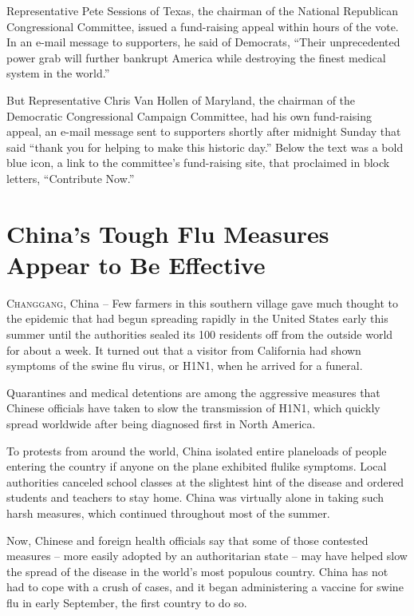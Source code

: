 ﻿\documentclass[12pt]{article}
\begin{document}
Representative Pete Sessions of Texas, the chairman of the National Republican Congressional
Committee, issued a fund-raising appeal within hours of the vote. In an e-mail message to
supporters, he said of Democrats, ``Their unprecedented power grab will further bankrupt America
while destroying the finest medical system in the world.''

But Representative Chris Van Hollen of Maryland, the chairman of the Democratic Congressional
Campaign Committee, had his own fund-raising appeal, an e-mail message sent to supporters shortly
after midnight Sunday that said ``thank you for helping to make this historic day.'' Below the text
was a bold blue icon, a link to the committee's fund-raising site, that proclaimed in block letters,
``Contribute Now.''

\section{China's Tough Flu Measures Appear to Be Effective}

\lettrine{C}{hanggang}, China -- Few farmers in this southern village gave
much thought to the epidemic that had begun spreading rapidly in the United States early this summer
until the authorities sealed its 100 residents off from the outside world for about a week. It
turned out that a visitor from California had shown symptoms of the swine flu virus, or H1N1, when
he arrived for a funeral.

Quarantines\cite{quarantine} and medical detentions are among the aggressive measures that Chinese
officials have taken to slow the transmission of H1N1, which quickly spread worldwide after being
diagnosed first in North America.

To protests from around the world, China isolated entire planeloads of people entering the country
if anyone on the plane exhibited flulike symptoms. Local authorities canceled school classes at the
slightest hint of the disease and ordered students and teachers to stay home. China was virtually
alone in taking such harsh measures, which continued throughout most of the summer.

Now, Chinese and foreign health officials say that some of those contested measures -- more easily
adopted by an authoritarian state -- may have helped slow the spread of the disease in the world's
most populous country. China has not had to cope with a crush of cases, and it began administering a
vaccine for swine flu in early September, the first country to do so.
\end{document}
